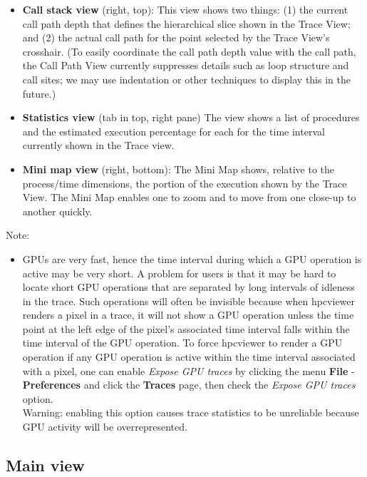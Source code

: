 \documentclass[english]{article}
\begin{document}
\begin{itemize}
\item \textbf{Call stack view} (right, top):
  This view shows two things: (1) the current call path depth that defines the hierarchical slice shown in the Trace View; and (2) the actual call path for the point selected by the Trace View's crosshair.
  (To easily coordinate the call path depth value with the call path, the Call Path View currently suppresses details such as loop structure and call sites; we may use indentation or other techniques to display this in the future.)

\item \textbf{Statistics view} (tab in top, right pane)
  The view shows a list of procedures and the estimated execution percentage for each for the time interval currently shown in the Trace view.


\item \textbf{Mini map view} (right, bottom):
  The Mini Map shows, relative to the process/time dimensions, the portion of the execution shown by the Trace View.
  The Mini Map enables one to zoom and to move from one close-up to another quickly.

\end{itemize}
Note:
\begin{itemize}
\item GPUs are very fast, hence the time interval during which a GPU operation is active may be very short. A problem for users is that it may be hard to locate short GPU operations that are separated by long intervals of idleness in the trace. Such operations will often be invisible because
 when hpcviewer renders a pixel in a trace, it will not show a GPU operation unless the time point at the left edge of the pixel's associated time interval falls within the time interval of the GPU operation.
 	To force hpcviewer to render a GPU operation if any GPU operation is active within the time interval associated with a pixel, one can enable \emph{Expose GPU traces} by clicking the menu \textbf{File} - \textbf{Preferences} and click the \textbf{Traces} page, then check the \emph{Expose GPU traces} option.
\\
Warning: enabling this option causes trace statistics to be unreliable because GPU activity will be overrepresented.
\end{itemize}




\subsection{Main view}
\end{document}
